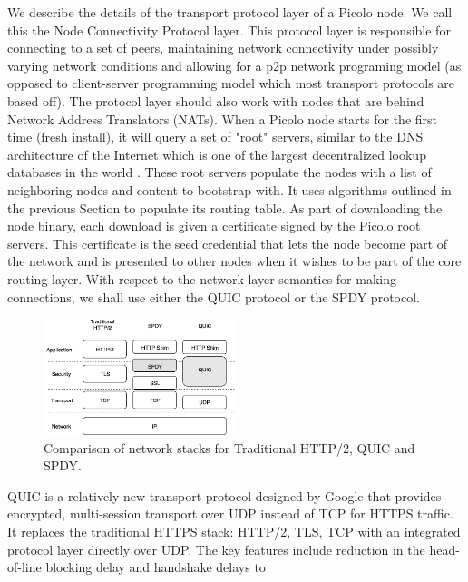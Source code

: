 We describe the details of the transport protocol layer of a \textsf{Picolo} node. We call this the Node Connectivity Protocol
layer. This protocol layer is responsible for connecting to a set of peers, maintaining network connectivity under
possibly varying network conditions and allowing for a p2p network programing model (as opposed to client-server
programming model which most transport protocols are based off).  The protocol layer should also work with nodes that
are behind Network Address Translators (NATs).
\newline\newline
When a \textsf{Picolo} node starts for the first time (fresh install), it will query a set of "root" servers, similar to the DNS
architecture of the Internet which is one of the largest decentralized lookup databases in the world \cite{icann_root}. 
These root servers populate the nodes with a list of neighboring nodes and content to bootstrap with. It uses algorithms
outlined in the previous Section to populate its routing table. As part of downloading the node binary, each download is given a certificate signed by the \textsf{Picolo} root servers. This
certificate is the seed credential that lets the node become part of the network and is presented to other nodes when it
wishes to be part of the core routing layer. With respect to the network layer semantics for making connections, we shall use either the QUIC protocol or the SPDY
protocol.
\begin{figure}[t]
    \centering
    \includegraphics[width=0.5\textwidth]{fig/pic_netlayer.png}
  \caption{Comparison of network stacks for Traditional HTTP/2, QUIC and SPDY.}
\end{figure}
\newline\newline
QUIC is a relatively new transport protocol designed by Google \cite{quic_sigcomm} that provides encrypted, multi-session transport over UDP
instead of TCP for HTTPS traffic. It replaces the traditional HTTPS stack: HTTP/2, TLS, TCP with an integrated protocol
layer directly over UDP. The key features include reduction in the head-of-line blocking delay and handshake delays to
